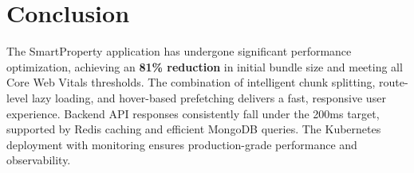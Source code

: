 \documentclass[12pt,a4paper]{article}
\begin{document}
\section{Conclusion}

The SmartProperty application has undergone significant performance optimization, achieving an \textbf{81\% reduction} in initial bundle size and meeting all Core Web Vitals thresholds. The combination of intelligent chunk splitting, route-level lazy loading, and hover-based prefetching delivers a fast, responsive user experience. Backend API responses consistently fall under the 200ms target, supported by Redis caching and efficient MongoDB queries. The Kubernetes deployment with monitoring ensures production-grade performance and observability.
\end{document}
